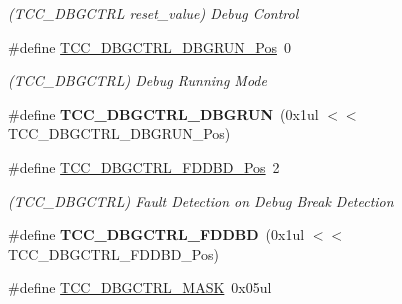 \begin{DoxyCompactItemize}
\begin{DoxyCompactList}\small\item\em (T\+C\+C\+\_\+\+D\+B\+G\+C\+T\+R\+L reset\+\_\+value) Debug Control \end{DoxyCompactList}\item 
\hypertarget{group___s_a_m_l21___t_c_c_ga6abeb27c7d0c6477fcf252bb1adba37b}{}\#define \hyperlink{group___s_a_m_l21___t_c_c_ga6abeb27c7d0c6477fcf252bb1adba37b}{T\+C\+C\+\_\+\+D\+B\+G\+C\+T\+R\+L\+\_\+\+D\+B\+G\+R\+U\+N\+\_\+\+Pos}~0\label{group___s_a_m_l21___t_c_c_ga6abeb27c7d0c6477fcf252bb1adba37b}

\begin{DoxyCompactList}\small\item\em (T\+C\+C\+\_\+\+D\+B\+G\+C\+T\+R\+L) Debug Running Mode \end{DoxyCompactList}\item 
\hypertarget{group___s_a_m_l21___t_c_c_ga3fc653a8d8d0d4b9a248e1083f998880}{}\#define {\bfseries T\+C\+C\+\_\+\+D\+B\+G\+C\+T\+R\+L\+\_\+\+D\+B\+G\+R\+U\+N}~(0x1ul $<$$<$ T\+C\+C\+\_\+\+D\+B\+G\+C\+T\+R\+L\+\_\+\+D\+B\+G\+R\+U\+N\+\_\+\+Pos)\label{group___s_a_m_l21___t_c_c_ga3fc653a8d8d0d4b9a248e1083f998880}

\item 
\hypertarget{group___s_a_m_l21___t_c_c_ga8b7e866816713d4668d07dc7e7633dbb}{}\#define \hyperlink{group___s_a_m_l21___t_c_c_ga8b7e866816713d4668d07dc7e7633dbb}{T\+C\+C\+\_\+\+D\+B\+G\+C\+T\+R\+L\+\_\+\+F\+D\+D\+B\+D\+\_\+\+Pos}~2\label{group___s_a_m_l21___t_c_c_ga8b7e866816713d4668d07dc7e7633dbb}

\begin{DoxyCompactList}\small\item\em (T\+C\+C\+\_\+\+D\+B\+G\+C\+T\+R\+L) Fault Detection on Debug Break Detection \end{DoxyCompactList}\item 
\hypertarget{group___s_a_m_l21___t_c_c_ga4bdab4cfba982eeb9a6eb4480566729a}{}\#define {\bfseries T\+C\+C\+\_\+\+D\+B\+G\+C\+T\+R\+L\+\_\+\+F\+D\+D\+B\+D}~(0x1ul $<$$<$ T\+C\+C\+\_\+\+D\+B\+G\+C\+T\+R\+L\+\_\+\+F\+D\+D\+B\+D\+\_\+\+Pos)\label{group___s_a_m_l21___t_c_c_ga4bdab4cfba982eeb9a6eb4480566729a}

\item 
\hypertarget{group___s_a_m_l21___t_c_c_gad2278d93889d4b210296c4d485a1f1c1}{}\#define \hyperlink{group___s_a_m_l21___t_c_c_gad2278d93889d4b210296c4d485a1f1c1}{T\+C\+C\+\_\+\+D\+B\+G\+C\+T\+R\+L\+\_\+\+M\+A\+S\+K}~0x05ul\label{group___s_a_m_l21___t_c_c_gad2278d93889d4b210296c4d485a1f1c1}


\end{DoxyCompactItemize}
